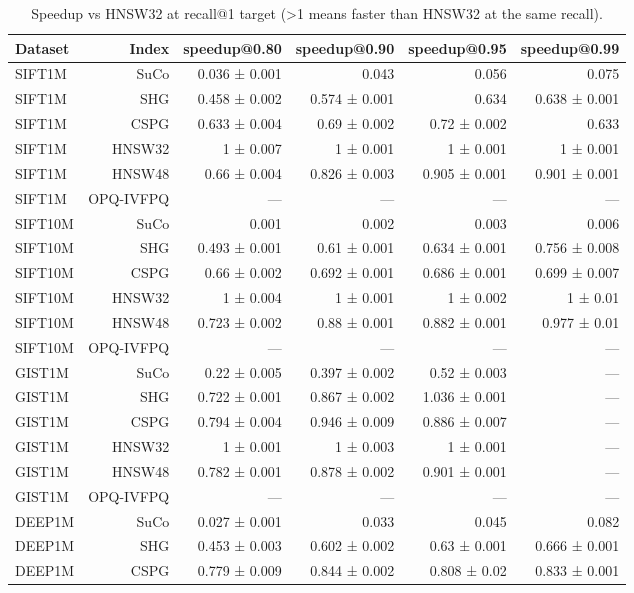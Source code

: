 \begin{table}[t]
\centering
\small
\caption{Speedup vs HNSW32 at recall@1 target (>1 means faster than HNSW32 at the same recall).}
\label{tab:speedup-k1}
\begin{tabular}{lrrrrr}
\toprule
Dataset & Index & speedup@0.80 & speedup@0.90 & speedup@0.95 & speedup@0.99 \\
\midrule
SIFT1M & SuCo & 0.036 ± 0.001 & 0.043 & 0.056 & 0.075 \\
SIFT1M & SHG & 0.458 ± 0.002 & 0.574 ± 0.001 & 0.634 & 0.638 ± 0.001 \\
SIFT1M & CSPG & 0.633 ± 0.004 & 0.69 ± 0.002 & 0.72 ± 0.002 & 0.633 \\
SIFT1M & HNSW32 & 1 ± 0.007 & 1 ± 0.001 & 1 ± 0.001 & 1 ± 0.001 \\
SIFT1M & HNSW48 & 0.66 ± 0.004 & 0.826 ± 0.003 & 0.905 ± 0.001 & 0.901 ± 0.001 \\
SIFT1M & OPQ-IVFPQ & — & — & — & — \\
SIFT10M & SuCo & 0.001 & 0.002 & 0.003 & 0.006 \\
SIFT10M & SHG & 0.493 ± 0.001 & 0.61 ± 0.001 & 0.634 ± 0.001 & 0.756 ± 0.008 \\
SIFT10M & CSPG & 0.66 ± 0.002 & 0.692 ± 0.001 & 0.686 ± 0.001 & 0.699 ± 0.007 \\
SIFT10M & HNSW32 & 1 ± 0.004 & 1 ± 0.001 & 1 ± 0.002 & 1 ± 0.01 \\
SIFT10M & HNSW48 & 0.723 ± 0.002 & 0.88 ± 0.001 & 0.882 ± 0.001 & 0.977 ± 0.01 \\
SIFT10M & OPQ-IVFPQ & — & — & — & — \\
GIST1M & SuCo & 0.22 ± 0.005 & 0.397 ± 0.002 & 0.52 ± 0.003 & — \\
GIST1M & SHG & 0.722 ± 0.001 & 0.867 ± 0.002 & 1.036 ± 0.001 & — \\
GIST1M & CSPG & 0.794 ± 0.004 & 0.946 ± 0.009 & 0.886 ± 0.007 & — \\
GIST1M & HNSW32 & 1 ± 0.001 & 1 ± 0.003 & 1 ± 0.001 & — \\
GIST1M & HNSW48 & 0.782 ± 0.001 & 0.878 ± 0.002 & 0.901 ± 0.001 & — \\
GIST1M & OPQ-IVFPQ & — & — & — & — \\
DEEP1M & SuCo & 0.027 ± 0.001 & 0.033 & 0.045 & 0.082 \\
DEEP1M & SHG & 0.453 ± 0.003 & 0.602 ± 0.002 & 0.63 ± 0.001 & 0.666 ± 0.001 \\
DEEP1M & CSPG & 0.779 ± 0.009 & 0.844 ± 0.002 & 0.808 ± 0.02 & 0.833 ± 0.001 \\

\end{tabular}
\end{table}
